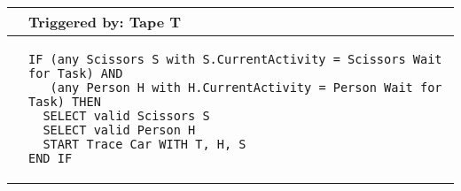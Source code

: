 \begin{longtable}{@{}>{\raggedright\arraybackslash}p{0.25cm}>{\raggedright\arraybackslash}p{13cm}@{}}
  \toprule
   & Triggered by: Tape T\\ \midrule 
  &
\begin{lstlisting}[language=CMPseudo]
IF (any Scissors S with S.CurrentActivity = Scissors Wait for Task) AND
   (any Person H with H.CurrentActivity = Person Wait for Task) THEN
  SELECT valid Scissors S
  SELECT valid Person H
  START Trace Car WITH T, H, S
END IF
\end{lstlisting}
  \\ \bottomrule
  \end{longtable}